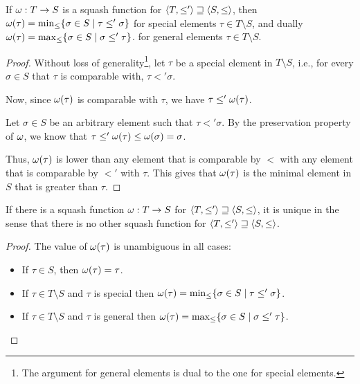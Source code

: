 \documentclass[main.tex]{subfiles}
\begin{document}
\begin{property}
    If $\omega: T \rightarrow S$ is a squash function for
    $\langle T, \leq' \rangle \sqsupseteq \langle S, \leq \rangle$,
    then $\omega(\tau) = \min_{\leq} \{ \sigma \in S \mid \tau \leq' \sigma \}$
    for special elements $\tau \in T \setminus S$, and dually
    $\omega(\tau) = \max_{\leq} \{ \sigma \in S \mid \sigma \leq' \tau \}$.
    for general elements $\tau \in T \setminus S$.
\end{property}
\begin{proof}
    Without loss of generality\footnote{The argument for general elements is dual to the one for special
        elements.},
    let $\tau$ be a special element in $T \setminus S$, i.e., for every
    $\sigma \in S$ that $\tau$ is comparable with, $\tau \less' \sigma$.

    Now, since $\omega(\tau)$ is comparable with $\tau$, we have
    $\tau \leq' \omega(\tau)$.

    Let $\sigma \in S$ be an arbitrary element such that $\tau \less' \sigma$.
    By the preservation property of $\omega$, we know that
    $\tau \leq' \omega(\tau) \leq \omega(\sigma) = \sigma$.

    Thus, $\omega(\tau)$ is lower than any element that is comparable
    by $\less$ with any element that is comparable by $\less'$ with $\tau$.
    This gives that $\omega(\tau)$ is the minimal element in $S$ that is
    greater than $\tau$.
\end{proof}
\begin{corollary}\label{prop:squash:unique}
    If there is a squash function $\omega: T \rightarrow S$ for
    $\langle T, \leq' \rangle \sqsupseteq \langle S, \leq \rangle$,
    it is unique in the sense that there is no other squash function for
    $\langle T, \leq' \rangle \sqsupseteq \langle S, \leq \rangle$.
\end{corollary}
\begin{proof}
    The value of $\omega(\tau)$ is unambiguous in all cases:
    \begin{itemize}
        \item If $\tau \in S$, then $\omega(\tau) = \tau$.
        \item If $\tau \in T \setminus S$ and $\tau$ is special
            then $\omega(\tau) = \min_{\leq} \{ \sigma \in S \mid \tau \leq' \sigma \}$.
        \item If $\tau \in T \setminus S$ and $\tau$ is general
            then $\omega(\tau) = \max_{\leq} \{ \sigma \in S \mid \sigma \leq' \tau \}$.
    \end{itemize}
\end{proof}
\end{document}
